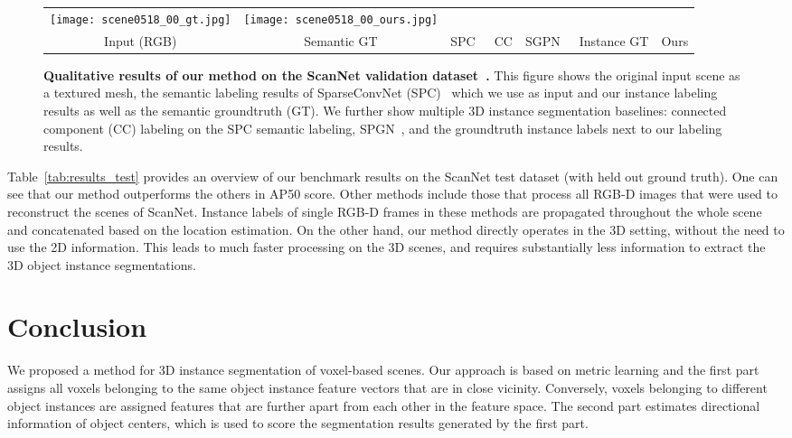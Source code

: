 \documentclass[10pt,twocolumn,letterpaper]{article}
\begin{document}
\begin{figure*}[ht!]
\begin{tabular}{ccccccc}
    \texttt{[image: scene0518\_00\_gt.jpg]} & 
    \texttt{[image: scene0518\_00\_ours.jpg]} \\[-0.2cm]
Input (RGB) & Semantic GT &  SPC~\cite{3DSemanticSegmentationWithSubmanifoldSparseConvNet} & CC & SGPN~\cite{Wang-et-al-CVPR-2018} & Instance GT & Ours \\
\end{tabular}
  \vspace{0.005cm}
  \caption{\textbf{Qualitative results of our method on the ScanNet validation dataset~\cite{Dai-et-al-CVPR-2017}.}
  This figure shows the original input scene as a textured mesh, the semantic labeling results of SparseConvNet (SPC)~\cite{3DSemanticSegmentationWithSubmanifoldSparseConvNet} which we use as input and our instance labeling results as well as the semantic groundtruth (GT). We further show multiple 3D instance segmentation baselines: connected component (CC) labeling on the SPC semantic labeling, SPGN~\cite{Wang-et-al-CVPR-2018}, and the groundtruth instance labels next to our labeling results.}
  \label{fig:qualitative_results_a}
\end{figure*}



Table~\ref{tab:results_test} provides an overview of our benchmark results on the ScanNet test dataset (with held out ground truth). One can see that our method outperforms the others in AP50 score. Other methods include those that process all RGB-D images that were used to reconstruct the scenes of ScanNet. Instance labels of single RGB-D frames in these methods are propagated throughout the whole scene and concatenated based on the location estimation. On the other hand, our method directly operates in the 3D setting, without the need to use the 2D information. This leads to much faster processing on the 3D scenes, and requires substantially less information to extract the 3D object instance segmentations.






 \section{Conclusion}
We proposed a method for 3D instance segmentation of voxel-based scenes.
Our approach is based on metric learning and the first part assigns all voxels belonging to the same object instance feature vectors that are in close vicinity. 
Conversely, voxels belonging to different object instances are assigned  features that are further apart from each other in the feature space. 
The second part estimates directional information of object centers, which is used to score the segmentation results generated by the first part.
\end{document}
